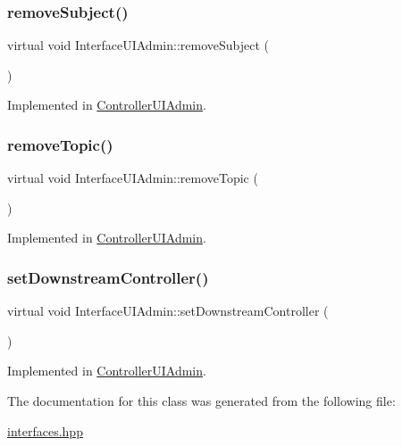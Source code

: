 \subsubsection{\texorpdfstring{remove\+Subject()}{removeSubject()}}
{\footnotesize\ttfamily virtual void Interface\+U\+I\+Admin\+::remove\+Subject (\begin{DoxyParamCaption}\item[{void}]{ }\end{DoxyParamCaption})\hspace{0.3cm}{\ttfamily [pure virtual]}}



Implemented in \hyperlink{class_controller_u_i_admin_a7799d896fb475d2731843c6a67db3390}{Controller\+U\+I\+Admin}.

\mbox{\label{class_interface_u_i_admin_a93530a289e1c659eaa12a8261f4d304e}} 
\subsubsection{\texorpdfstring{remove\+Topic()}{removeTopic()}}
{\footnotesize\ttfamily virtual void Interface\+U\+I\+Admin\+::remove\+Topic (\begin{DoxyParamCaption}\item[{void}]{ }\end{DoxyParamCaption})\hspace{0.3cm}{\ttfamily [pure virtual]}}



Implemented in \hyperlink{class_controller_u_i_admin_aad9b0c9e945e3075bb8eb25b55378f27}{Controller\+U\+I\+Admin}.

\mbox{\label{class_interface_u_i_admin_a4c663ca0610288ba4ac5b8f772454cfc}} 
\subsubsection{\texorpdfstring{set\+Downstream\+Controller()}{setDownstreamController()}}
{\footnotesize\ttfamily virtual void Interface\+U\+I\+Admin\+::set\+Downstream\+Controller (\begin{DoxyParamCaption}\item[{\hyperlink{class_interface_b_l_admin}{Interface\+B\+L\+Admin} $\ast$}]{ }\end{DoxyParamCaption})\hspace{0.3cm}{\ttfamily [pure virtual]}}



Implemented in \hyperlink{class_controller_u_i_admin_aad33fe10f31f698f1bf0343aa5b2b7ec}{Controller\+U\+I\+Admin}.



The documentation for this class was generated from the following file\+:\begin{DoxyCompactItemize}
\item 
\hyperlink{interfaces_8hpp}{interfaces.\+hpp}\end{DoxyCompactItemize}
